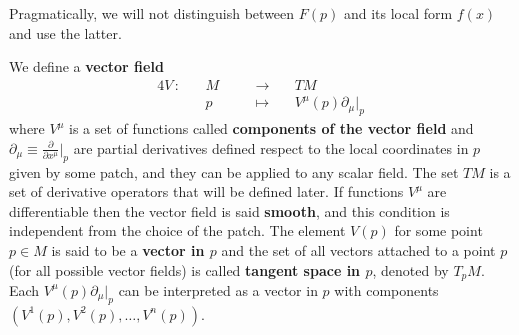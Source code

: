 \documentclass[../main/main.tex]{subfiles}
\begin{document}
Pragmatically, we will not distinguish between $F(p)$ and its local form $f(x)$ and use the latter.
%
\begin{definition}{}
We define a \textbf{vector field}
\begin{alignat*}{4}
V\,:\,&&M&&\quad\longrightarrow\quad&TM\\
&&p&&\quad\longmapsto\quad& V^\mu(p)\partial_\mu\big\vert_p
\end{alignat*}
where $V^\mu$ is a set of  functions called \textbf{components of the vector field} and $\partial_\mu\equiv\frac\partial{\partial x^\mu}\vert_p$ are partial derivatives defined respect to the local coordinates in $p$ given by some patch, and they can be applied to any scalar field. The set $TM$ is a set of derivative operators that will be defined later. If functions $V^\mu$ are differentiable then the vector field is said \textbf{smooth}, and this condition is independent from the choice of the patch. The element $V(p)$ for some point $p\in M$ is said to be a  \textbf{vector in $p$} and the set of all vectors attached to a point $p$ (for all possible vector fields) is called \textbf{tangent space in $p$}, denoted by $T_pM$. Each $V^\mu(p)\partial_\mu\vert_p$ can be interpreted as a vector in $p$ with components $(V^1(p),V^2(p),\dots,V^n(p))$.


\end{definition}
\end{document}
